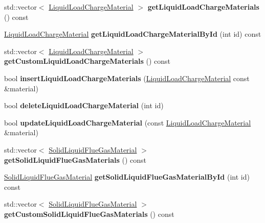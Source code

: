 \begin{DoxyCompactItemize}
std\+::vector$<$ \hyperlink{class_liquid_load_charge_material}{Liquid\+Load\+Charge\+Material} $>$ {\bfseries get\+Liquid\+Load\+Charge\+Materials} () const
\item 
\mbox{\label{class_s_q_lite_a3f31756b0fc49be7123e7146cbb12c70}} 
\hyperlink{class_liquid_load_charge_material}{Liquid\+Load\+Charge\+Material} {\bfseries get\+Liquid\+Load\+Charge\+Material\+By\+Id} (int id) const
\item 
\mbox{\label{class_s_q_lite_a1a252d50bc2e861325f120a814fddd37}} 
std\+::vector$<$ \hyperlink{class_liquid_load_charge_material}{Liquid\+Load\+Charge\+Material} $>$ {\bfseries get\+Custom\+Liquid\+Load\+Charge\+Materials} () const
\item 
\mbox{\label{class_s_q_lite_aff9ccdb8af003d3a0a3fdc9a85af77d8}} 
bool {\bfseries insert\+Liquid\+Load\+Charge\+Materials} (\hyperlink{class_liquid_load_charge_material}{Liquid\+Load\+Charge\+Material} const \&material)
\item 
\mbox{\label{class_s_q_lite_a2a3451cb60446d9a90da4cb08920dcfe}} 
bool {\bfseries delete\+Liquid\+Load\+Charge\+Material} (int id)
\item 
\mbox{\label{class_s_q_lite_a89805e7aeb9d72f5dfa6928aac681eab}} 
bool {\bfseries update\+Liquid\+Load\+Charge\+Material} (const \hyperlink{class_liquid_load_charge_material}{Liquid\+Load\+Charge\+Material} \&material)
\item 
\mbox{\label{class_s_q_lite_aecba5bffe035af787b17b5bf5997d825}} 
std\+::vector$<$ \hyperlink{class_solid_liquid_flue_gas_material}{Solid\+Liquid\+Flue\+Gas\+Material} $>$ {\bfseries get\+Solid\+Liquid\+Flue\+Gas\+Materials} () const
\item 
\mbox{\label{class_s_q_lite_aa7ea5aa679227d695fe38848236281ee}} 
\hyperlink{class_solid_liquid_flue_gas_material}{Solid\+Liquid\+Flue\+Gas\+Material} {\bfseries get\+Solid\+Liquid\+Flue\+Gas\+Material\+By\+Id} (int id) const
\item 
\mbox{\label{class_s_q_lite_a23b34dae2fa12690d3718755fc373b42}} 
std\+::vector$<$ \hyperlink{class_solid_liquid_flue_gas_material}{Solid\+Liquid\+Flue\+Gas\+Material} $>$ {\bfseries get\+Custom\+Solid\+Liquid\+Flue\+Gas\+Materials} () const

\end{DoxyCompactItemize}

